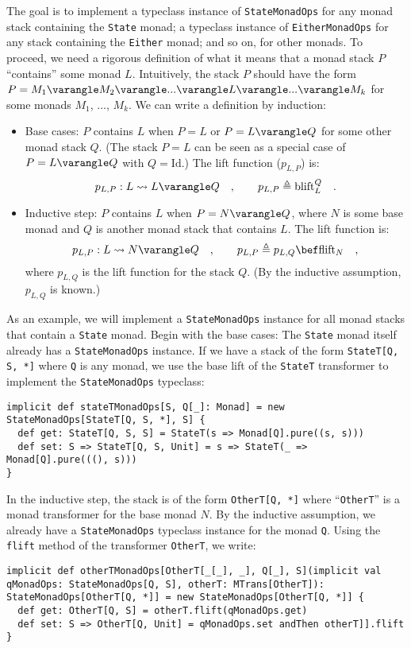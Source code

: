 The goal is to implement a typeclass instance of \lstinline!StateMonadOps!
for any monad stack containing the \lstinline!State! monad; a typeclass
instance of \lstinline!EitherMonadOps! for any stack containing the
\lstinline!Either! monad; and so on, for other monads. To proceed,
we need a rigorous definition of what it means that a monad stack
$P$ \textsf{``}contains\textsf{''} some monad $L$. Intuitively, the stack $P$ should
have the form $P=M_{1}\varangle M_{2}\varangle...\varangle L\varangle...\varangle M_{k}$
for some monads $M_{1}$, ..., $M_{k}$. We can write a definition
by induction: 
\begin{itemize}
\item Base cases: $P$ contains $L$ when $P=L$ or $P=L\varangle Q$ for
some other monad stack $Q$. (The stack $P=L$ can be seen as a special
case of $P=L\varangle Q$ with $Q=\text{Id}$.) The lift function
($p_{L,P}$) is:
\[
p_{L,P}:L\leadsto L\varangle Q\quad,\quad\quad p_{L,P}\triangleq\text{blift}_{L}^{Q}\quad.
\]
\item Inductive step: $P$ contains $L$ when $P=N\varangle Q$, where $N$
is some base monad and $Q$ is another monad stack that contains $L$.
The lift function is:
\[
p_{L,P}:L\leadsto N\varangle Q\quad,\quad\quad p_{L,P}\triangleq p_{L,Q}\bef\text{flift}_{N}\quad,
\]
where $p_{L,Q}$ is the lift function for the stack $Q$. (By the
inductive assumption, $p_{L,Q}$ is known.)
\end{itemize}
As an example, we will implement a \lstinline!StateMonadOps! instance
for all monad stacks that contain a \lstinline!State! monad. Begin
with the base cases: The \lstinline!State! monad itself already has
a \lstinline!StateMonadOps! instance. If we have a stack of the form
\lstinline!StateT[Q, S, *]! where \lstinline!Q! is any monad, we
use the base lift of the \lstinline!StateT! transformer to implement
the \lstinline!StateMonadOps! typeclass:
\begin{lstlisting}
implicit def stateTMonadOps[S, Q[_]: Monad] = new StateMonadOps[StateT[Q, S, *], S] {
  def get: StateT[Q, S, S] = StateT(s => Monad[Q].pure((s, s)))
  def set: S => StateT[Q, S, Unit] = s => StateT(_ => Monad[Q].pure(((), s)))
}
\end{lstlisting}

In the inductive step, the stack is of the form \lstinline!OtherT[Q, *]!
where \textsf{``}\lstinline!OtherT!\textsf{''} is a monad transformer for the base
monad $N$. By the inductive assumption, we already have a \lstinline!StateMonadOps!
typeclass instance for the monad \lstinline!Q!. Using the \lstinline!flift!
method of the transformer \lstinline!OtherT!, we write:
\begin{lstlisting}
implicit def otherTMonadOps[OtherT[_[_], _], Q[_], S](implicit val qMonadOps: StateMonadOps[Q, S], otherT: MTrans[OtherT]): StateMonadOps[OtherT[Q, *]] = new StateMonadOps[OtherT[Q, *]] {
  def get: OtherT[Q, S] = otherT.flift(qMonadOps.get)
  def set: S => OtherT[Q, Unit] = qMonadOps.set andThen otherT]].flift
}
\end{lstlisting}

